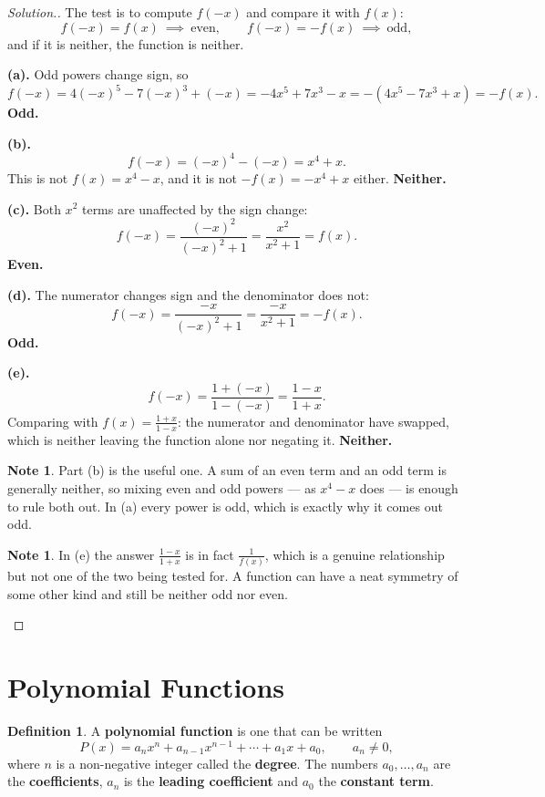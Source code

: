 \documentclass[11pt,a4paper]{article}
\theoremstyle{definition}
\newtheorem{definition}[thm]{Definition}
\newtheorem{note}[thm]{Note}
\newenvironment{solution}
  {\renewcommand{\qedsymbol}{}\begin{proof}[\textit{Solution}.]}
  {\end{proof}}
\begin{document}
\begin{solution}
The test is to compute $f(-x)$ and compare it with $f(x)$:
$$f(-x)=f(x)\ \implies\ \text{even},\qquad f(-x)=-f(x)\ \implies\ \text{odd},$$
and if it is neither, the function is neither.

\textbf{(a).} Odd powers change sign, so
$$f(-x)=4(-x)^5-7(-x)^3+(-x)=-4x^5+7x^3-x=-\left(4x^5-7x^3+x\right)=-f(x).$$
\textbf{Odd.}

\textbf{(b).}
$$f(-x)=(-x)^4-(-x)=x^4+x.$$
This is not $f(x)=x^4-x$, and it is not $-f(x)=-x^4+x$ either. \textbf{Neither.}

\textbf{(c).} Both $x^2$ terms are unaffected by the sign change:
$$f(-x)=\frac{(-x)^2}{(-x)^2+1}=\frac{x^2}{x^2+1}=f(x).$$
\textbf{Even.}

\textbf{(d).} The numerator changes sign and the denominator does not:
$$f(-x)=\frac{-x}{(-x)^2+1}=\frac{-x}{x^2+1}=-f(x).$$
\textbf{Odd.}

\textbf{(e).}
$$f(-x)=\frac{1+(-x)}{1-(-x)}=\frac{1-x}{1+x}.$$
Comparing with $f(x)=\frac{1+x}{1-x}$: the numerator and denominator have swapped, which
is neither leaving the function alone nor negating it. \textbf{Neither.}

\begin{note}
Part (b) is the useful one. A sum of an even term and an odd term is generally neither,
so mixing even and odd powers --- as $x^4-x$ does --- is enough to rule both out. In (a)
every power is odd, which is exactly why it comes out odd.
\end{note}

\begin{note}
In (e) the answer $\frac{1-x}{1+x}$ is in fact $\frac{1}{f(x)}$, which is a genuine
relationship but not one of the two being tested for. A function can have a neat
symmetry of some other kind and still be neither odd nor even.
\end{note}
\end{solution}

\section{Polynomial Functions}

\begin{definition}
A \textbf{polynomial function} is one that can be written
$$P(x)=a_nx^n+a_{n-1}x^{n-1}+\cdots+a_1x+a_0,\qquad a_n\neq 0,$$
where $n$ is a non-negative integer called the \textbf{degree}. The numbers
$a_0,\ldots,a_n$ are the \textbf{coefficients}, $a_n$ is the \textbf{leading
coefficient} and $a_0$ the \textbf{constant term}.
\end{definition}
\end{document}
